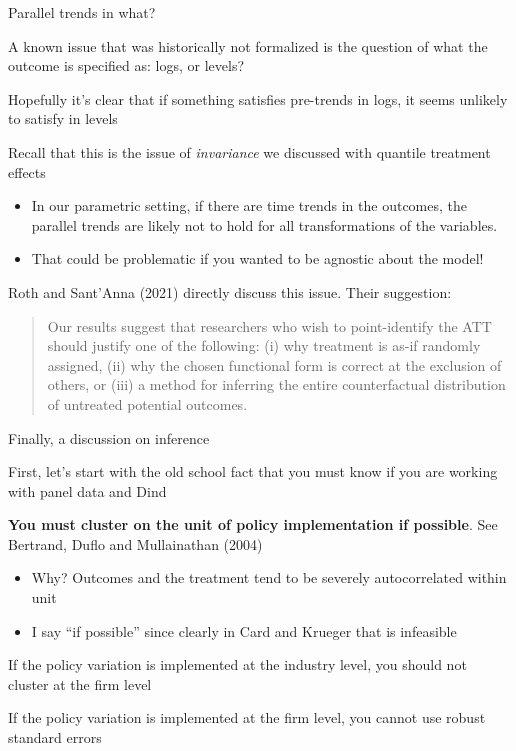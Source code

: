 \documentclass[notes,11pt, aspectratio=169]{beamer}
\newenvironment{wideitemize}{\itemize\addtolength{\itemsep}{10pt}}{\enditemize}
\begin{document}
\begin{frame}{Parallel trends in what?}
	\begin{wideitemize}
		\item A known issue that was historically not formalized is the
		question of what the outcome is specified as: logs, or levels?
		\item Hopefully it's clear that if something satisfies pre-trends in
		logs, it seems unlikely to satisfy in levels
		\item Recall that this is the issue of \emph{invariance} we
		discussed with quantile treatment effects
		\begin{itemize}
			\item In our parametric setting, if there are time trends in the
			      outcomes, the parallel trends are likely not to hold for all
			      transformations of the variables.
			\item That could be problematic if you wanted to be agnostic about
			      the model!
		\end{itemize}
		\item Roth and Sant'Anna (2021) directly discuss this issue. Their suggestion:
		\begin{quote}
			Our results suggest that researchers who wish to point-identify
			the ATT should justify one of the following: (i) why treatment
			is as-if randomly assigned, (ii) why the chosen functional form
			is correct at the exclusion of others, or (iii) a method for
			inferring the entire counterfactual distribution of untreated
			potential outcomes.
		\end{quote}
	\end{wideitemize}
\end{frame}

\begin{frame}{Finally, a discussion on inference}
	\begin{wideitemize}
		\item First, let's start with the old school fact that you must know
		if you are working with panel data and Dind
		\item \textbf{You must cluster on the unit of policy implementation
			if possible}. See Bertrand, Duflo and Mullainathan (2004)
		\begin{itemize}
			\item Why? Outcomes and the treatment tend to be severely
			      autocorrelated within unit
			\item I say ``if possible'' since clearly in Card and Krueger that
			      is infeasible
		\end{itemize}
		\item If the policy variation is implemented at the industry level,
		you should not cluster at the firm level
		\item If the policy variation is implemented at the firm level, you
		cannot use robust standard errors
	\end{wideitemize}
\end{frame}
\end{document}
